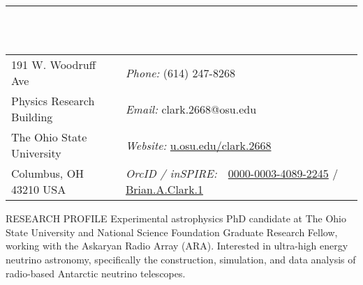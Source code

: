 \documentclass{resume} %
\begin{document}

\vspace{-1cm}
\rule{\textwidth}{0.1cm} \\ \\
\begin{tabular}{@{}p{2in}p{4in}}
191 W. Woodruff Ave             & {\it Phone:}  (614) 247-8268 \\            
Physics Research Building   & {\it Email:}  clark.2668@osu.edu 
 \\         
The Ohio State University & {\it Website:} \url{u.osu.edu/clark.2668} \\       
Columbus, OH  43210 USA  & {\it OrcID / inSPIRE:} \,\,      \href{https://orcid.org/0000-0003-4089-2245}{0000-0003-4089-2245}  / \href{https://inspirehep.net/author/profile/Brian.A.Clark.1}{Brian.A.Clark.1}\\     
\end{tabular}


\begin{rSection}{RESEARCH PROFILE}
Experimental astrophysics PhD candidate at The Ohio State University and National Science Foundation Graduate Research Fellow, working with the Askaryan Radio Array (ARA). Interested in ultra-high energy neutrino astronomy, specifically the construction, simulation, and data analysis of radio-based Antarctic neutrino telescopes.
\end{rSection}
\end{document}
